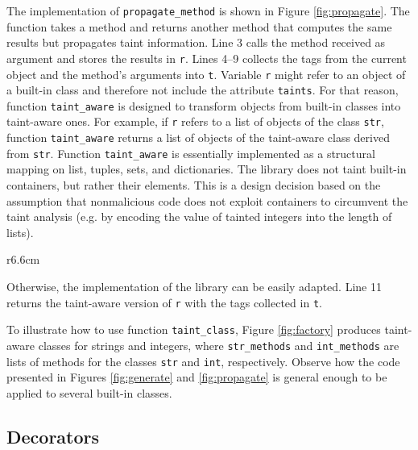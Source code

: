 \documentclass[oribibl]{llncs}
\newcommand{\nametklass}{taint-aware }
\newcommand{\nameTklass}{Taint-aware }
\begin{document}
The implementation of \texttt{propagate\_method} is shown in Figure
\ref{fig:propagate}. The function takes a method and returns another
method that computes the same results but propagates taint information. Line 3
calls the method received as argument and stores the results in 
\texttt{r}. 
Lines 4--9 collects the tags from the current object and 
the method's arguments into \texttt{t}. 
Variable \texttt{r} 
might refer to an object of a built-in class and
therefore not include the attribute \texttt{taints}. For that reason, 
function \texttt{taint\_aware} is designed to 
transform objects from built-in classes  
into \nametklass ones. 
For example, if \texttt{r} refers
to a list of objects of the class \texttt{str}, function \texttt{taint\_aware} returns  
a list of objects of the \nametklass class 
derived from \texttt{str}. 
Function \texttt{taint\_aware} 
is essentially implemented as a structural mapping on list, tuples,
sets, and dictionaries. 
The library does not
taint built-in containers, but rather their elements. This is a design decision 
based on the assumption that nonmalicious code does not exploit
containers to circumvent the taint analysis (e.g. by 
encoding the value of tainted integers into 
the length of lists).
\begin{wrapfigure}{r}{6.6cm}
\vspace{-20pt}
{\small{

\caption{\label{fig:factory} \nameTklass classes for strings and
  integers}
}}
\vspace{-20pt}
\end{wrapfigure}
Otherwise, the implementation of the library can be easily adapted.
Line 11 returns the taint-aware version of \texttt{r} 
with the tags collected in \texttt{t}. 



  
To illustrate how to use  function \texttt{taint\_class}, Figure \ref{fig:factory} 
produces \nametklass classes for strings and integers, where 
\texttt{str\_methods} and \texttt{int\_methods} are lists 
of methods for the classes \texttt{str} and
\texttt{int}, respectively. Observe how the code presented in Figures
\ref{fig:generate} and \ref{fig:propagate} is general enough to be
applied to several built-in classes.
  

\subsection{Decorators}
\end{document}

